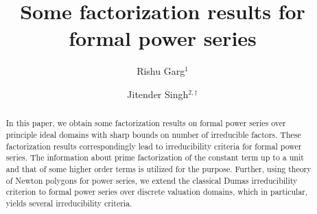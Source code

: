 \documentclass[12pt,reqno]{amsart}%
\begin{document}
\newtheorem{theorem}{Theorem}
\newtheorem{corollary}[theorem]{Corollary}
\newtheorem{lemma}[theorem]{Lemma}
\theoremstyle{definition}
\newtheorem{example}{Example}
\newtheorem*{examples}{Examples}
\newtheorem*{notation}{Notation}
\theoremstyle{theorem}
\newtheorem{thmx}{Theorem}
\renewcommand{\thethmx}{\text{\Alph{thmx}}}%

\theoremstyle{theorem}
\newtheorem{corolmx}{Corollary}
\renewcommand{\thecorolmx}{\text{\Alph{corolmx}}}%

\newtheorem{lemmax}{Lemma}
\renewcommand{\thelemmax}{\text{\Alph{lemmax}}}%
\hoffset=-0cm
\theoremstyle{definition}
\newtheorem*{definition}{Definition}
\newtheorem*{remark}{\bf Remark}

\title{\bf Some factorization results for formal power series}
\author{Rishu Garg$^{1}$ {\large {}}}
\author{Jitender Singh$^{2,\dagger}$ {\large {}}}
\address[1,2]{Department of Mathematics,
Guru Nanak Dev University, Amritsar-143005, India\newline %
{\tt rishugarg128@gmail.com}, {\tt jitender.math@gndu.ac.in}}
\markright{}
\date{}
\footnotetext[2]{Corresponding author email(s): {\tt jitender.math@gndu.ac.in}

\url{https://sites.google.com/view/sonumaths3/home}\\

2020MSC: {Primary 13F25; 11Y05; 13P05}\\%

\emph{Keywords}: Formal power series; Irreducibility; Integer coefficients; Factorization; Dumas irreducibility criterion; Newton polygon.
}
\maketitle
\newcommand{\K}{\mathbb{K}}
\begin{abstract}
In this paper, we obtain some factorization results on formal power series over principle ideal domains with sharp bounds on number of irreducible factors. These factorization results correspondingly lead to irreducibility criteria for formal power series. The information about prime factorization of the constant term up to a unit and that of some higher order terms is utilized for the purpose. Further, using theory of Newton polygons for power series, we extend the classical Dumas irreducibility criterion to formal power series over discrete valuation domains, which  in particular, yields several irreducibility criteria.
\end{abstract}
\end{document}
